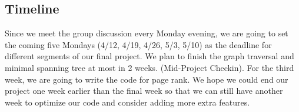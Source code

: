 \documentclass[11pt]{amsart}
\theoremstyle{definition}
\begin{document}
\begin{spacing}{1}
\vspace{0.6cm}
\section{Timeline}
    Since we meet the group discussion every Monday evening, we are going to set the coming five Mondays (4/12, 4/19, 4/26, 5/3, 5/10) as the deadline for different segments of our final project. We plan to finish the graph traversal and minimal spanning tree at most in 2 weeks. (Mid-Project Checkin). For the third week, we are going to write the code for page rank. We hope we could end our project one week earlier than the final week so that we can still have another week to optimize our code and consider adding more extra features. 
\end{spacing}
\end{document}
